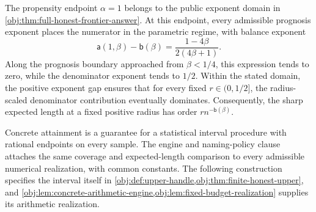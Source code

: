 The propensity endpoint \(\alpha=1\) belongs to the public exponent domain in \cref{obj:thm:full-honest-frontier-answer}. At this endpoint, every admissible prognosis exponent places the numerator in the parametric regime, with balance exponent
\[
\mathsf a(1,\beta)-\mathsf b(\beta)
=
\frac{1-4\beta}{2(4\beta+1)}.
\]
Along the prognosis boundary approached from \(\beta<1/4\), this expression tends to zero, while the denominator exponent tends to \(1/2\). Within the stated domain, the positive exponent gap ensures that for every fixed \(r\in(0,1/2]\), the radius-scaled denominator contribution eventually dominates. Consequently, the sharp expected length at a fixed positive radius has order \(r n^{-\mathsf b(\beta)}\).

Concrete attainment is a guarantee for a statistical interval procedure with rational endpoints on every sample. The engine and naming-policy clause attaches the same coverage and expected-length comparison to every admissible numerical realization, with common constants. The following construction specifies the interval itself in \cref{obj:def:upper-handle,obj:thm:finite-honest-upper}, and \cref{obj:lem:concrete-arithmetic-engine,obj:lem:fixed-budget-realization} supplies its arithmetic realization.
